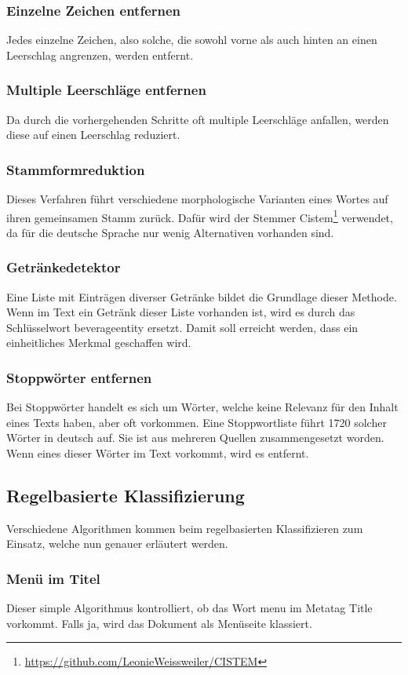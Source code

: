 \subsubsection{Einzelne Zeichen entfernen}
Jedes einzelne Zeichen, also solche, die sowohl vorne als auch hinten an einen Leerschlag angrenzen, werden entfernt.
\subsubsection{Multiple Leerschläge entfernen}
Da durch die vorhergehenden Schritte oft multiple Leerschläge anfallen, werden diese auf einen Leerschlag reduziert.
\subsubsection{Stammformreduktion}
Dieses Verfahren führt verschiedene morphologische Varianten eines Wortes auf ihren gemeinsamen Stamm zurück.
Dafür wird der Stemmer \glqq Cistem\footnote{\url{https://github.com/LeonieWeissweiler/CISTEM}}\grqq{} verwendet, da für die deutsche Sprache nur wenig Alternativen vorhanden sind. 
\subsubsection{Getränkedetektor}
Eine Liste mit Einträgen diverser Getränke bildet die Grundlage dieser Methode.
Wenn im Text ein Getränk dieser Liste vorhanden ist, wird es durch das Schlüsselwort \glqq beverageentity\grqq{} ersetzt.
Damit soll erreicht werden, dass ein einheitliches Merkmal geschaffen wird.
\subsubsection{Stoppwörter entfernen}
Bei Stoppwörter handelt es sich um Wörter, welche keine Relevanz für den Inhalt eines Texts haben, aber oft vorkommen.
Eine Stoppwortliste führt 1720 solcher Wörter in deutsch auf. Sie ist aus mehreren Quellen zusammengesetzt worden.
Wenn eines dieser Wörter im Text vorkommt, wird es entfernt.
\subsection{Regelbasierte Klassifizierung}
Verschiedene Algorithmen kommen beim regelbasierten Klassifizieren zum Einsatz, welche nun genauer erläutert werden.
\subsubsection{Menü im Titel}
Dieser simple Algorithmus kontrolliert, ob das Wort \glqq menu\grqq{} im Metatag \glqq Title\grqq{} vorkommt.
Falls ja, wird das Dokument als Menüseite klassiert.
